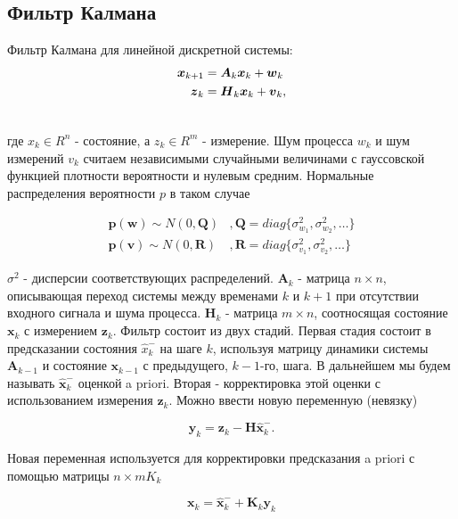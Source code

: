 \documentclass[12pt,a4paper]{article}
\begin{document}
\subsection{Фильтр Калмана}

Фильтр Калмана для линейной дискретной системы:
\begin{align}
	\label{eq:kalman_state_evolution} \boldsymbol x_{k+1} &= \boldsymbol A_k \boldsymbol x_k + \boldsymbol w_k \\ 
	\label{eq:kalman_measurement} \boldsymbol z_k &= \boldsymbol H_k \boldsymbol x_k + \boldsymbol v_k, \\
\notag
\end{align}

где $x_k \in R^n$ - состояние, а $z_k \in R^m$ - измерение. Шум процесса $w_k$ и шум измерений $v_k$ считаем независимыми случайными величинами с гауссовской функцией плотности вероятности и нулевым средним. Нормальные распределения вероятности $p$ в таком случае

\begin{align*}
	\boldsymbol p(\boldsymbol w) \sim N(0,\boldsymbol Q) &, \boldsymbol Q = diag\{ \sigma^2_{w_1}, \sigma^2_{w_2}, \dots \} \\
	\boldsymbol p(\boldsymbol v) \sim N(0,\boldsymbol R) &, \boldsymbol R = diag\{ \sigma^2_{v_1}, \sigma^2_{v_2}, \dots \}
\end{align*}

$\sigma^2$ - дисперсии соответствующих распределений. $\boldsymbol A_k$ - матрица $n \times n$, описывающая переход системы между временами $k$ и $k+1$ при отсутствии входного сигнала и шума процесса. $\boldsymbol H_k$ - матрица $m \times n$, соотносящая состояние $\boldsymbol x_k$ с измерением $\boldsymbol z_k$. Фильтр состоит из двух стадий. Первая стадия состоит в предсказании состояния $\hat{x}_k^-$ на шаге $k$, используя матрицу динамики системы $\boldsymbol A_{k-1}$ и состояние $\boldsymbol x_{k-1}$ с предыдущего, $k-1$-го, шага. В дальнейшем мы будем называть $\hat{\boldsymbol x}_k^-$ оценкой a priori. Вторая - корректировка этой оценки с использованием измерения $\boldsymbol z_k$. Можно ввести новую переменную (невязку)

$$ \boldsymbol y_k = \boldsymbol z_k - \boldsymbol H\hat{\boldsymbol x}_k^- . $$

Новая переменная используется для корректировки предсказания a priori с помощью матрицы $n \times m K_k$

\begin{equation}
	\label{eq:kalman_correction_state}
	\boldsymbol x_k = \hat{\boldsymbol x}_k^- + \boldsymbol K_k \boldsymbol y_k
\end{equation}
\end{document}
